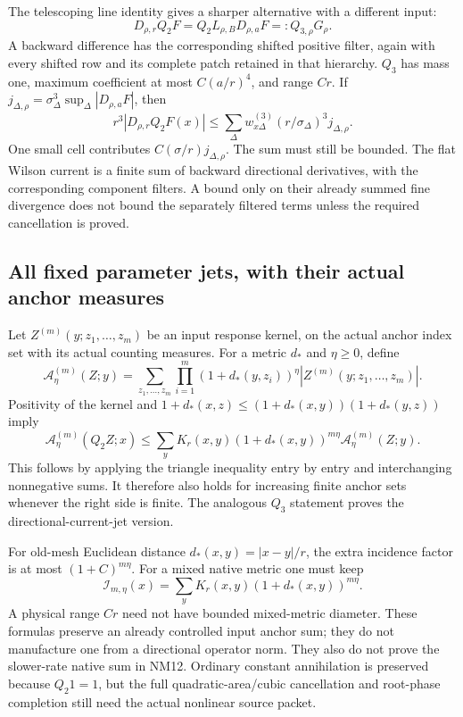 \documentclass[11pt,letterpaper]{article}
\theoremstyle{plain}
\theoremstyle{remark}\newtheorem{remark}[theorem]{Scope}
\begin{document}
The telescoping line identity gives a sharper alternative with a different
input:
\begin{equation}
 D_{\rho,r}Q_2F=Q_2L_{\rho,B}D_{\rho,a}F
 =:Q_{3,\rho}G_\rho.
 \label{eq:Q3}
\end{equation}
A backward difference has the corresponding shifted positive filter, again
with every shifted row and its complete patch retained in that hierarchy.
$Q_3$ has mass one, maximum coefficient at most $C(a/r)^4$, and range
$Cr$. If
$j_{\Delta,\rho}=\sigma_\Delta^3\sup_\Delta|D_{\rho,a}F|$, then
\begin{equation}
 r^3|D_{\rho,r}Q_2F(x)|
 \le\sum_\Delta w^{(3)}_{x\Delta}
               (r/\sigma_\Delta)^3j_{\Delta,\rho}.
 \label{eq:currentoverlap}
\end{equation}
One small cell contributes $C(\sigma/r)j_{\Delta,\rho}$. The sum must
still be bounded. The flat Wilson current is a finite sum of backward
directional derivatives, with the corresponding component filters. A bound
only on their already summed fine divergence does not bound the separately
filtered terms unless the required cancellation is proved.

\subsection{All fixed parameter jets, with their actual anchor measures}

Let $Z^{(m)}(y;z_1,\ldots,z_m)$ be an input response kernel, on the actual
anchor index set with its actual counting measures. For a metric $d_*$ and
$\eta\ge0$,
define
\begin{equation}
 \mathcal A^{(m)}_\eta(Z;y)
 =\sum_{z_1,\ldots,z_m}
     \prod_{i=1}^m(1+d_*(y,z_i))^\eta
        |Z^{(m)}(y;z_1,\ldots,z_m)|.
\end{equation}
Positivity of the kernel and
$1+d_*(x,z)\le(1+d_*(x,y))(1+d_*(y,z))$ imply
\begin{equation}
 \mathcal A^{(m)}_\eta(Q_2Z;x)
 \le\sum_yK_r(x,y)(1+d_*(x,y))^{m\eta}
                    \mathcal A^{(m)}_\eta(Z;y).
 \label{eq:anchor}
\end{equation}
This follows by applying the triangle inequality entry by entry and
interchanging nonnegative sums. It therefore also holds for increasing finite
anchor sets whenever the right side is finite. The analogous $Q_3$ statement
proves the directional-current-jet version.

For old-mesh Euclidean distance $d_*(x,y)=|x-y|/r$, the extra incidence
factor is at most $(1+C)^{m\eta}$. For a mixed native metric one must keep
\begin{equation}
 \mathcal I_{m,\eta}(x)
 =\sum_yK_r(x,y)(1+d_*(x,y))^{m\eta}.
 \label{eq:incidence}
\end{equation}
A physical range $Cr$ need not have bounded mixed-metric diameter. These
formulas preserve an already controlled input anchor sum; they do not
manufacture one from a directional operator norm. They also do not prove
the slower-rate native sum in NM12. Ordinary constant annihilation is
preserved because $Q_2 1=1$, but the full quadratic-area/cubic cancellation
and root-phase completion still need the actual nonlinear source packet.
\end{document}

